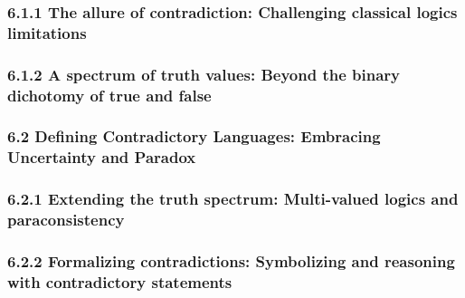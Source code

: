 \hypertarget{the-allure-of-contradiction-challenging-classical-logics-limitations}{%
\subsubsection*{6.1.1 The allure of contradiction: Challenging classical
logic\textquotesingle s
limitations}\label{the-allure-of-contradiction-challenging-classical-logics-limitations}}

\hypertarget{a-spectrum-of-truth-values-beyond-the-binary-dichotomy-of-true-and-false}{%
\subsubsection*{6.1.2 A spectrum of truth values: Beyond the binary
dichotomy of true and
false}\label{a-spectrum-of-truth-values-beyond-the-binary-dichotomy-of-true-and-false}}

\hypertarget{defining-contradictory-languages-embracing-uncertainty-and-paradox}{%
\subsubsection*{\texorpdfstring{\textbf{6.2 Defining Contradictory
Languages: Embracing Uncertainty and Paradox}
}{6.2 Defining Contradictory Languages: Embracing Uncertainty and Paradox }}\label{defining-contradictory-languages-embracing-uncertainty-and-paradox}}

\hypertarget{extending-the-truth-spectrum-multi-valued-logics-and-paraconsistency}{%
\subsubsection*{\texorpdfstring{6.2.1 Extending the truth spectrum:
Multi-valued logics and paraconsistency
}{6.2.1 Extending the truth spectrum: Multi-valued logics and paraconsistency }}\label{extending-the-truth-spectrum-multi-valued-logics-and-paraconsistency}}

\hypertarget{formalizing-contradictions-symbolizing-and-reasoning-with-contradictory-statements}{%
\subsubsection*{\texorpdfstring{6.2.2 Formalizing contradictions:
Symbolizing and reasoning with contradictory statements
}{6.2.2 Formalizing contradictions: Symbolizing and reasoning with contradictory statements }}\label{formalizing-contradictions-symbolizing-and-reasoning-with-contradictory-statements}}

